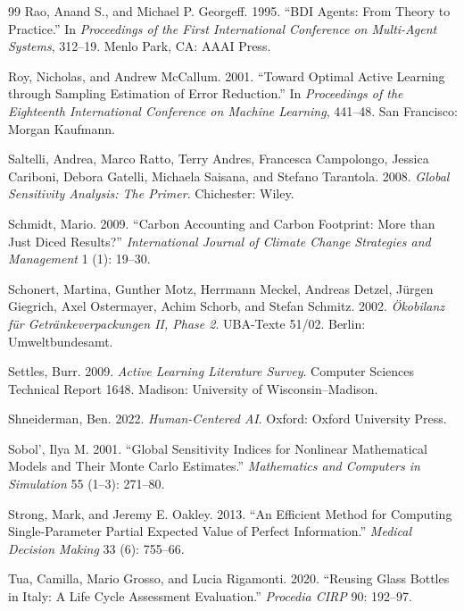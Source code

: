 \begin{thebibliography}{99}
Rao, Anand S., and Michael P. Georgeff. 1995. ``BDI Agents: From Theory to Practice.'' In \emph{Proceedings of the First International Conference on Multi-Agent Systems}, 312--19. Menlo Park, CA: AAAI Press.

Roy, Nicholas, and Andrew McCallum. 2001. ``Toward Optimal Active Learning through Sampling Estimation of Error Reduction.'' In \emph{Proceedings of the Eighteenth International Conference on Machine Learning}, 441--48. San Francisco: Morgan Kaufmann.

Saltelli, Andrea, Marco Ratto, Terry Andres, Francesca Campolongo, Jessica Cariboni, Debora Gatelli, Michaela Saisana, and Stefano Tarantola. 2008. \emph{Global Sensitivity Analysis: The Primer}. Chichester: Wiley.

Schmidt, Mario. 2009. ``Carbon Accounting and Carbon Footprint: More than Just Diced Results?'' \emph{International Journal of Climate Change Strategies and Management} 1 (1): 19--30.

Schonert, Martina, Gunther Motz, Herrmann Meckel, Andreas Detzel, J\"urgen Giegrich, Axel Ostermayer, Achim Schorb, and Stefan Schmitz. 2002. \emph{\"Okobilanz f\"ur Getr\"ankeverpackungen II, Phase 2}. UBA-Texte 51/02. Berlin: Umweltbundesamt.

Settles, Burr. 2009. \emph{Active Learning Literature Survey}. Computer Sciences Technical Report 1648. Madison: University of Wisconsin--Madison.

Shneiderman, Ben. 2022. \emph{Human-Centered AI}. Oxford: Oxford University Press.

Sobol', Ilya M. 2001. ``Global Sensitivity Indices for Nonlinear Mathematical Models and Their Monte Carlo Estimates.'' \emph{Mathematics and Computers in Simulation} 55 (1--3): 271--80.

Strong, Mark, and Jeremy E. Oakley. 2013. ``An Efficient Method for Computing Single-Parameter Partial Expected Value of Perfect Information.'' \emph{Medical Decision Making} 33 (6): 755--66.

Tua, Camilla, Mario Grosso, and Lucia Rigamonti. 2020. ``Reusing Glass Bottles in Italy: A Life Cycle Assessment Evaluation.'' \emph{Procedia CIRP} 90: 192--97.


\end{thebibliography}
